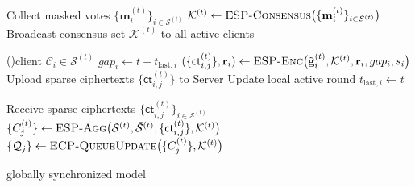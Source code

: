 \documentclass[a4paper,12pt]{article}
\begin{document}
\begin{algorithm}[t]
{    \BlankLine
    Collect masked votes $\{\mathbf{m}_i^{(t)}\}_{i \in \mathcal{S}^{(t)}}$\;\label{line:recv_mask}
    $\mathcal{K}^{(t)} \leftarrow \textsc{ESP-Consensus}\bigl(\{\mathbf{m}_i^{(t)}\}_{i \in \mathcal{S}^{(t)}}\bigr)$\label{line:consensus}
    Broadcast consensus set $\mathcal{K}^{(t)}$ to all active clients\;\label{line:broadcast}
    
    \BlankLine
    \ForEach(){client $\mathcal{C}_i \in \mathcal{S}^{(t)}$}{\label{line:enc_start}
        $gap_i \leftarrow t - t_{\text{last},i}$\;\label{line:gap}
        $(\{\mathsf{ct}_{i,j}^{(t)}\}, \mathbf{r}_i) \leftarrow \textsc{ESP-Enc}\bigl(\tilde{\mathbf{g}}_i^{(t)}, \mathcal{K}^{(t)}, \mathbf{r}_i, gap_i, s_i\bigr)$\label{line:enc}
        Upload sparse ciphertexts $\{\mathsf{ct}_{i,j}^{(t)}\}$ to Server\;\label{line:upload}
        Update local active round $t_{\text{last},i} \leftarrow t$\;\label{line:update_tlast}
    }\label{line:enc_end}
    
    \BlankLine
    Receive sparse ciphertexts $\{\mathsf{ct}_{i,j}^{(t)}\}_{i \in \mathcal{S}^{(t)}}$\;\label{line:recv_ct}
    $\{C_j^{(t)}\} \leftarrow \textsc{ESP-Agg}\bigl(\mathcal{S}^{(t)}, \bar{\mathcal{S}}^{(t)}, \{\mathsf{ct}_{i,j}^{(t)}\}, \mathcal{K}^{(t)}\bigr)$\label{line:agg}
    $\{\mathcal{Q}_j\} \leftarrow \textsc{ECP-QueueUpdate}\bigl(\{C_j^{(t)}\}, \mathcal{K}^{(t)}\bigr)$\label{line:queue}
}
\Return globally synchronized model\;
\end{algorithm}
\end{document}
